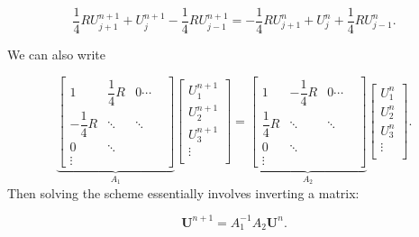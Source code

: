 \documentclass[letterpaper]{article}
\begin{document}
\begin{equation}
\dfrac{1}{4}R U^{n+1}_{j+1} + U^{n+1}_j - \dfrac{1}{4}R U^{n+1}_{j-1} =  -\dfrac{1}{4}R U^{n}_{j+1} + U^{n}_j + \dfrac{1}{4}R U^{n}_{j-1}.
\end{equation}

We can also write

\begin{equation}
\underbrace{\begin{bmatrix}
1 & \dfrac{1}{4}R & 0 \cdots \\
-\dfrac{1}{4}R & \ddots & \ddots \\
0 & \ddots \\
\vdots & & &
\end{bmatrix}}_{A_1} 
\begin{bmatrix}
U^{n+1}_1 \\ U^{n+1}_2 \\ U^{n+1}_3 \\ \vdots \\ 
\end{bmatrix} = 
\underbrace{\begin{bmatrix}
1 & -\dfrac{1}{4}R & 0 \cdots \\
\dfrac{1}{4}R & \ddots & \ddots \\
0 & \ddots \\
\vdots & & &
\end{bmatrix}}_{A_2}  
\begin{bmatrix}
U^{n}_1 \\ U^{n}_2 \\ U^{n}_3 \\ \vdots \\ 
\end{bmatrix}.
\end{equation}
Then solving the scheme essentially involves inverting a matrix:

\begin{equation}
\textbf{U}^{n+1} = A_1^{-1}A_2 \textbf{U}^n.
\end{equation}
\end{document}
